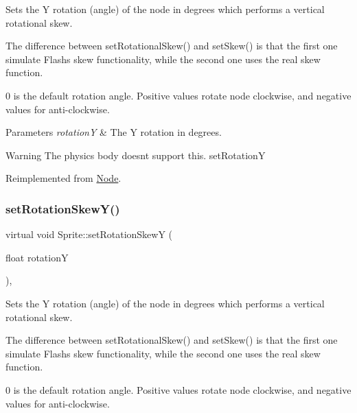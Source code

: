 Sets the Y rotation (angle) of the node in degrees which performs a vertical rotational skew.

The difference between {\ttfamily set\+Rotational\+Skew()} and {\ttfamily set\+Skew()} is that the first one simulate Flash\textquotesingle{}s skew functionality, while the second one uses the real skew function.

0 is the default rotation angle. Positive values rotate node clockwise, and negative values for anti-\/clockwise.


\begin{DoxyParams}{Parameters}
{\em rotationY} & The Y rotation in degrees.\\
\hline
\end{DoxyParams}
\begin{DoxyWarning}{Warning}
The physics body doesn\textquotesingle{}t support this.  set\+RotationY 
\end{DoxyWarning}


Reimplemented from \hyperlink{classNode_a901c5fbd2327fbd6fd14771fd45d71af}{Node}.

\mbox{\label{classSprite_a5f3af508d1f9e146ac93c0eaad44dfb1}} 
\subsubsection{\texorpdfstring{set\+Rotation\+Skew\+Y()}{setRotationSkewY()}\hspace{0.1cm}{\footnotesize\ttfamily [2/2]}}
{\footnotesize\ttfamily virtual void Sprite\+::set\+Rotation\+SkewY (\begin{DoxyParamCaption}\item[{float}]{rotationY }\end{DoxyParamCaption})\hspace{0.3cm}{\ttfamily [override]}, {\ttfamily [virtual]}}

Sets the Y rotation (angle) of the node in degrees which performs a vertical rotational skew.

The difference between {\ttfamily set\+Rotational\+Skew()} and {\ttfamily set\+Skew()} is that the first one simulate Flash\textquotesingle{}s skew functionality, while the second one uses the real skew function.

0 is the default rotation angle. Positive values rotate node clockwise, and negative values for anti-\/clockwise.


